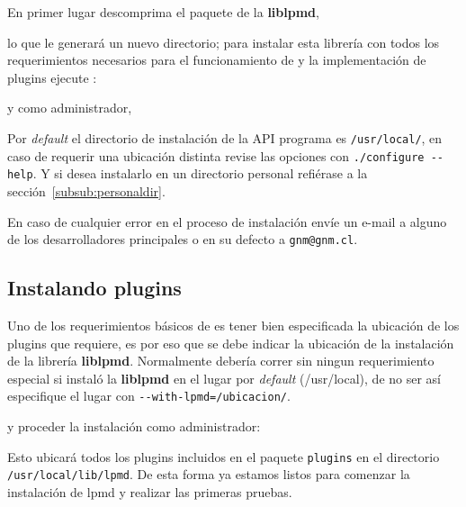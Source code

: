 En primer lugar descomprima el paquete de la \textbf{liblpmd},


lo que le generar\'a un nuevo directorio; para instalar esta librer\'ia con todos los requerimientos necesarios para el funcionamiento de \lpmd y la implementaci\'on de plugins ejecute :


y como administrador,




Por \textit{default} el directorio de instalaci\'on de la API programa es \verb|/usr/local/|, en caso de requerir una ubicaci\'on distinta revise las opciones con \verb|./configure --help|. Y si desea instalarlo en un directorio personal refi\'erase a la secci\'on~\ref{subsub:personaldir}.

En caso de cualquier error en el proceso de instalaci\'on env\'ie un e-mail a alguno de los desarrolladores principales o en su defecto a \verb|gnm@gnm.cl|.

\subsection{Instalando plugins}

Uno de los requerimientos b\'asicos de \lpmd es tener bien especificada la ubicaci\'on de los plugins que \lpmd requiere, es por eso que se debe indicar la ubicaci\'on de la instalaci\'on de la librer\'ia \textbf{liblpmd}. Normalmente deber\'ia correr sin ningun requerimiento especial si instal\'o la \textbf{liblpmd} en el lugar por \textit{default} (/usr/local), de no ser as\'i especifique el lugar con \verb|--with-lpmd=/ubicacion/|.


y proceder la instalaci\'on como administrador:


Esto ubicar\'a todos los plugins incluidos en el paquete \verb|plugins| en el directorio \verb|/usr/local/lib/lpmd|. De esta forma ya estamos listos para comenzar la instalaci\'on de lpmd y realizar las primeras pruebas.

